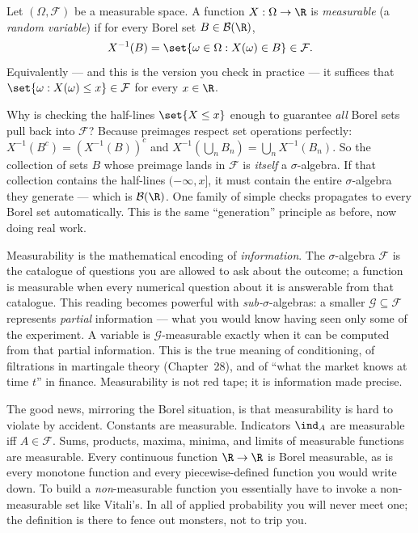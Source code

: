 \begin{definition}
\label{ch36:rv-def}
Let $(\Omega, \mathcal{F})$ be a measurable space. A function $X : \Omega \to \R$
is \emph{measurable} (a \emph{random variable}) if for every Borel set
$B \in \mathcal{B}(\R)$,
\[
  X^{-1}(B) = \set{\omega \in \Omega : X(\omega) \in B} \in \mathcal{F}.
\]
Equivalently --- and this is the version you check in practice --- it suffices that
$\set{\omega : X(\omega) \le x} \in \mathcal{F}$ for every $x \in \R$.
\end{definition}

\begin{whybox}
Why is checking the half-lines $\set{X \le x}$ enough to guarantee \emph{all}
Borel sets pull back into $\mathcal{F}$? Because preimages respect set operations
perfectly: $X^{-1}(B^c) = (X^{-1}(B))^c$ and
$X^{-1}\!\left(\bigcup_n B_n\right) = \bigcup_n X^{-1}(B_n)$. So the collection of
sets $B$ whose preimage lands in $\mathcal{F}$ is \emph{itself} a $\sigma$-algebra.
If that collection contains the half-lines $(-\infty, x]$, it must contain the
entire $\sigma$-algebra they generate --- which is $\mathcal{B}(\R)$. One family of
simple checks propagates to every Borel set automatically. This is the same
``generation'' principle as before, now doing real work.
\end{whybox}

\begin{happeningbox}
Measurability is the mathematical encoding of \emph{information}. The
$\sigma$-algebra $\mathcal{F}$ is the catalogue of questions you are allowed to ask
about the outcome; a function is measurable when every numerical question about it
is answerable from that catalogue. This reading becomes powerful with
\emph{sub-}$\sigma$-algebras: a smaller $\mathcal{G} \subseteq \mathcal{F}$
represents \emph{partial} information --- what you would know having seen only some
of the experiment. A variable is $\mathcal{G}$-measurable exactly when it can be
computed from that partial information. This is the true meaning of conditioning,
of filtrations in martingale theory (Chapter~28), and of ``what the market knows
at time $t$'' in finance. Measurability is not red tape; it is information made
precise.
\end{happeningbox}

\begin{example}
\label{ch36:meas-examples}
The good news, mirroring the Borel situation, is that measurability is hard to
violate by accident. Constants are measurable. Indicators $\ind_A$ are measurable
iff $A \in \mathcal{F}$. Sums, products, maxima, minima, and limits of measurable
functions are measurable. Every continuous function $\R \to \R$ is Borel
measurable, as is every monotone function and every piecewise-defined function you
would write down. To build a \emph{non}-measurable function you essentially have to
invoke a non-measurable set like Vitali's. In all of applied probability you will
never meet one; the definition is there to fence out monsters, not to trip you.
\end{example}

